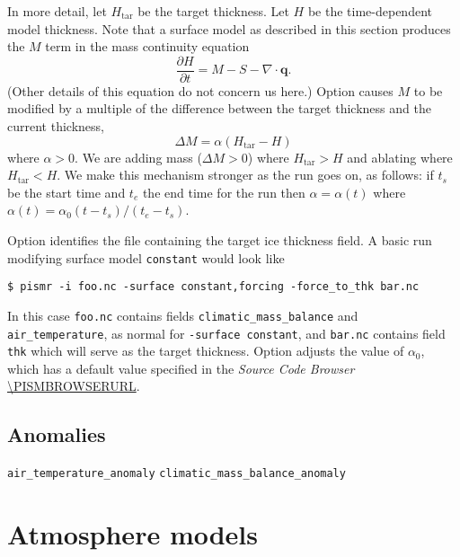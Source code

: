 \documentclass[titlepage,letterpaper,final]{scrartcl}
\begin{document}
In more detail, let $H_{\text{tar}}$ be the target thickness. Let $H$ be the
time-dependent model thickness. Note that a surface model as described in this
section produces the $M$ term in the mass continuity equation
$$\frac{\partial H}{\partial t} = M - S - \nabla\cdot \mathbf{q}.$$
(Other details of this equation do not concern us here.) Option
 causes $M$ to be modified by a multiple of the
difference between the target thickness and the current thickness,
$$\Delta M = \alpha (H_{\text{tar}} - H)$$
where $\alpha>0$. We are adding mass ($\Delta M>0$) where $H_{\text{tar}} > H$
and ablating where $H_{\text{tar}} < H$. We make this mechanism stronger as the
run goes on, as follows: if $t_s$ be the start time and $t_e$ the end time for
the run then $\alpha=\alpha(t)$ where $\alpha(t) = \alpha_0 (t-t_s)/(t_e-t_s)$.

Option  identifies the file containing the target ice
thickness field. A basic run modifying surface model \texttt{constant} would
look like
\begin{verbatim}
$ pismr -i foo.nc -surface constant,forcing -force_to_thk bar.nc
\end{verbatim}%

In this case \texttt{foo.nc} contains fields \texttt{climatic_mass_balance} and \texttt{air_temperature},
as normal for \texttt{-surface constant}, and \texttt{bar.nc} contains field
\texttt{thk} which will serve as the target thickness. Option
 adjusts the value of $\alpha_0$, which has a
default value specified in the \emph{Source Code Browser}
\url{\PISMBROWSERURL}.

\subsection{Anomalies}
\label{sec:surface-anomaly}

\texttt{air_temperature_anomaly} \texttt{climatic_mass_balance_anomaly}



\newcommand{\atmosphere}{Atmosphere models (\texttt{-atmosphere})}
\section{Atmosphere models}
\label{sec:atmosphere}
\end{document}
